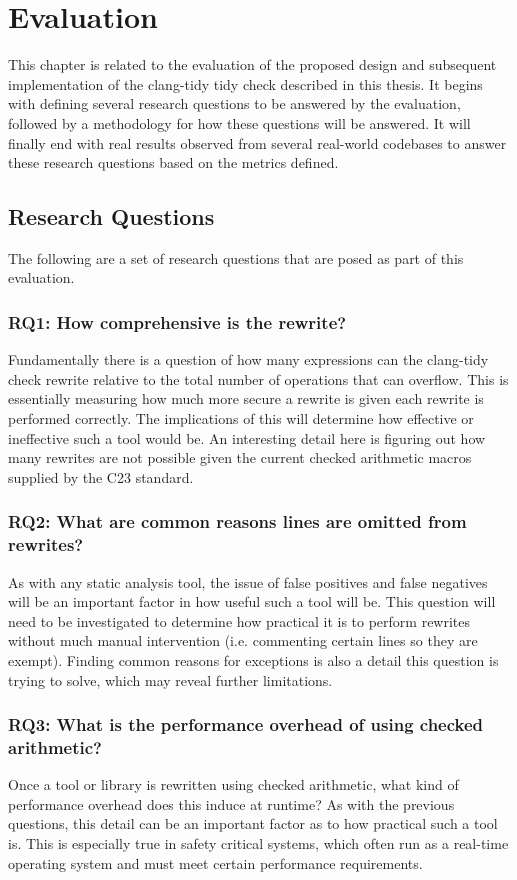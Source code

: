 \chapter{Evaluation}
\label{sec:evaluation}

This chapter is related to the evaluation of the proposed design and subsequent implementation of the clang-tidy tidy check described in this thesis. It begins with defining several research questions to be answered by the evaluation, followed by a methodology for how these questions will be answered. It will finally end with real results observed from several real-world codebases to answer these research questions based on the metrics defined.

\section{Research Questions}

The following are a set of research questions that are posed as part of this evaluation.

\subsection{\textbf{RQ1: How comprehensive is the rewrite?}}
Fundamentally there is a question of how many expressions can the clang-tidy check rewrite relative to the total number of operations that can overflow. This is essentially measuring how much more secure a rewrite is given each rewrite is performed correctly. The implications of this will determine how effective or ineffective such a tool would be. An interesting detail here is figuring out how many rewrites are not possible given the current checked arithmetic macros supplied by the C23 standard.

\subsection{\textbf{RQ2: What are common reasons lines are omitted from rewrites?}}
As with any static analysis tool, the issue of false positives and false negatives will be an important factor in how useful such a tool will be. This question will need to be investigated to determine how practical it is to perform rewrites without much manual intervention (i.e. commenting certain lines so they are exempt). Finding common reasons for exceptions is also a detail this question is trying to solve, which may reveal further limitations.

\subsection{\textbf{RQ3: What is the performance overhead of using checked arithmetic?}}
Once a tool or library is rewritten using checked arithmetic, what kind of performance overhead does this induce at runtime? As with the previous questions, this detail can be an important factor as to how practical such a tool is. This is especially true in safety critical systems, which often run as a real-time operating system and must meet certain performance requirements.

